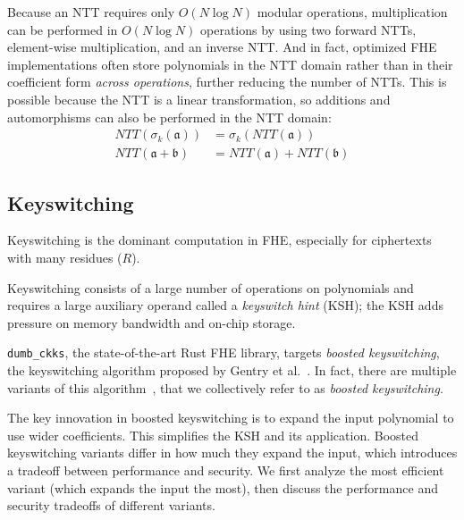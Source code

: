 Because an NTT requires only $O(N \log N)$ modular operations, 
multiplication can be performed in $O(N \log N)$ operations by using two forward NTTs,
element-wise multiplication, and an inverse NTT.
And in fact, optimized FHE implementations often store polynomials in the NTT domain
rather than in their coefficient form \emph{across operations}, further reducing the number of NTTs.
This is possible because the NTT is a linear transformation, so additions and automorphisms can also be performed in the NTT domain:
\vspace{-0.05in} %
\begin{align*}
    NTT(\sigma_k(\mathfrak{a})) &= \sigma_k(NTT(\mathfrak{a})) \\
    NTT(\mathfrak{a} + \mathfrak{b}) &= NTT(\mathfrak{a}) + NTT(\mathfrak{b})
\end{align*}
\vspace{-0.2in}

\subsection{Keyswitching}\label{sec:keyswitching}

Keyswitching is the dominant computation in FHE, especially for ciphertexts 
with many residues ($R$).


Keyswitching consists of a large number of operations on polynomials and 
requires a large auxiliary operand called a  \emph{keyswitch hint} (KSH);
the KSH adds pressure on memory bandwidth and on-chip storage.


\verb!dumb_ckks!, the state-of-the-art Rust FHE library, targets \emph{boosted
keyswitching}, the keyswitching algorithm
proposed by Gentry et al.~\cite[Section 3.1]{gentry:crypto2012:homomorphic}.
In fact, there are multiple variants of this algorithm~\cite[Section 5.3.4]{halevi2020helib},
that we collectively refer to as \emph{boosted keyswitching}.

The key innovation in boosted keyswitching is to expand the input polynomial to use wider coefficients.
This simplifies the KSH and its application.
Boosted keyswitching variants differ in how much they expand the input,
which introduces a tradeoff between performance and security.
We first analyze the most efficient variant (which expands the input the most),
then discuss the performance and security tradeoffs of different variants.

